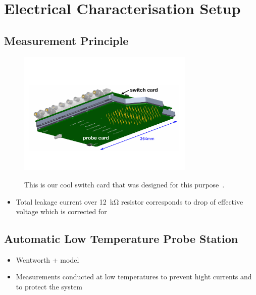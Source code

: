 \section{Electrical Characterisation Setup}
\label{sec:setup}

\subsection{Measurement Principle}
\label{subsec:setup_principle}
\begin{figure}[h]
	\centering
	\includegraphics[width=0.75\textwidth]{figures/example_switchprobecard.pdf}
	\label{fig:switchprobecard_CAD}
	\caption{
	This is our cool switch card that was designed for this purpose~\cite{pitters:array2019}.
	}
\end{figure}

\begin{itemize}
	\item Total leakage current over \SI{12}{\kilo\ohm} resistor corresponds to drop of effective voltage which is corrected for
\end{itemize}


\subsection{Automatic Low Temperature Probe Station}
\label{subsec:setup_ALPS}

\begin{itemize}
	\item Wentworth + model
	\item Measurements conducted at low temperatures to prevent hight currents and to protect the system
\end{itemize}

